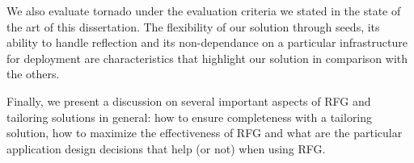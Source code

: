 We also evaluate tornado under the evaluation criteria we stated in the state of the art of this dissertation. The flexibility of our solution through seeds, its ability to handle reflection and its non-dependance on a particular infrastructure for deployment are characteristics that highlight our solution in comparison with the others.

Finally, we present a discussion on several important aspects of RFG and tailoring solutions in general: how to ensure completeness with a tailoring solution, how to maximize the effectiveness of RFG and what are the particular application design decisions that help (or not) when using RFG.

